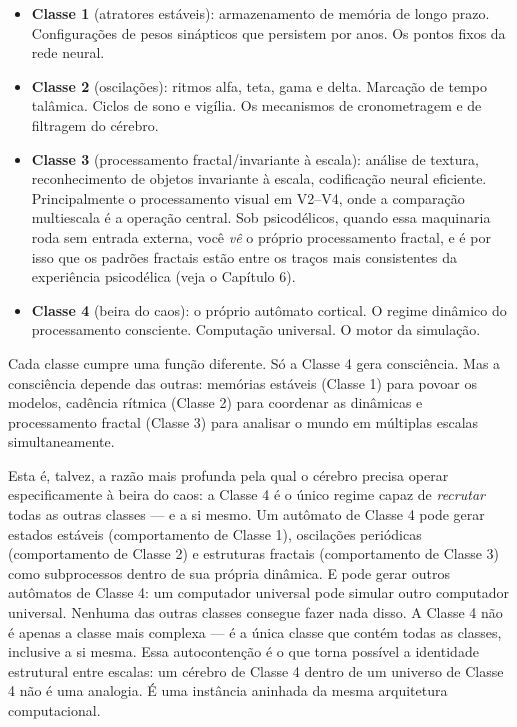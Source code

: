 \documentclass[11pt, twoside, openright]{book}
\begin{document}
\begin{itemize}
  \item \textbf{Classe 1} (atratores estáveis): armazenamento de memória de longo prazo. Configurações de pesos sinápticos que persistem por anos. Os pontos fixos da rede neural.
  \item \textbf{Classe 2} (oscilações): ritmos alfa, teta, gama e delta. Marcação de tempo talâmica. Ciclos de sono e vigília. Os mecanismos de cronometragem e de filtragem do cérebro.
  \item \textbf{Classe 3} (processamento fractal/\allowbreak{}invariante à escala): análise de textura, reconhecimento de objetos invariante à escala, codificação neural eficiente. Principalmente o processamento visual em V2--V4, onde a comparação multiescala é a operação central. Sob psicodélicos, quando essa maquinaria roda sem entrada externa, você \textit{vê} o próprio processamento fractal, e é por isso que os padrões fractais estão entre os traços mais consistentes da experiência psicodélica (veja o Capítulo 6).
  \item \textbf{Classe 4} (beira do caos): o próprio autômato cortical. O regime dinâmico do processamento consciente. Computação universal. O motor da simulação.
\end{itemize}

Cada classe cumpre uma função diferente. Só a Classe 4 gera consciência. Mas a consciência depende das outras: memórias estáveis (Classe 1) para povoar os modelos, cadência rítmica (Classe 2) para coordenar as dinâmicas e processamento fractal (Classe 3) para analisar o mundo em múltiplas escalas simultaneamente.

Esta é, talvez, a razão mais profunda pela qual o cérebro precisa operar especificamente à beira do caos: a Classe 4 é o único regime capaz de \textit{recrutar} todas as outras classes --- e a si mesmo. Um autômato de Classe 4 pode gerar estados estáveis (comportamento de Classe 1), oscilações periódicas (comportamento de Classe 2) e estruturas fractais (comportamento de Classe 3) como subprocessos dentro de sua própria dinâmica. E pode gerar outros autômatos de Classe 4: um computador universal pode simular outro computador universal. Nenhuma das outras classes consegue fazer nada disso. A Classe 4 não é apenas a classe mais complexa --- é a única classe que contém todas as classes, inclusive a si mesma. Essa autocontenção é o que torna possível a identidade estrutural entre escalas: um cérebro de Classe 4 dentro de um universo de Classe 4 não é uma analogia. É uma instância aninhada da mesma arquitetura computacional.
\end{document}
